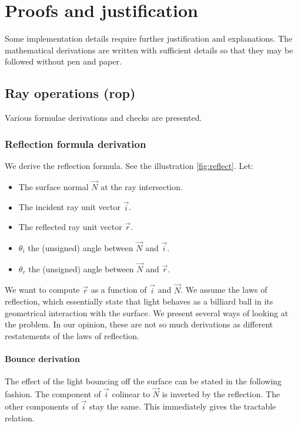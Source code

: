 \section{Proofs and justification}
\label{sec:justification}

Some implementation details require further justification and explanations.
The mathematical derivations are written with sufficient details so that
they may be followed without pen and paper.

\subsection{Ray operations (rop)}
Various formulae derivations and checks are presented.

\subsubsection{Reflection formula derivation}
We derive the reflection formula. See the illustration \cref{fig:reflect}.
Let: \begin{itemize}
\item The surface normal $\overrightarrow{N}$ at the ray intersection.
\item The incident ray unit vector $\overrightarrow{i}$.
\item The reflected ray unit vector $\overrightarrow{r}$.
\item $\theta_i$ the (unsigned) angle between $\overrightarrow{N}$ and
      $\overrightarrow{i}$.
\item $\theta_r$ the (unsigned) angle between $\overrightarrow{N}$ and
      $\overrightarrow{r}$.
\end{itemize}

We want to compute $\overrightarrow{r}$ as a function of $\overrightarrow{i}$
and $\overrightarrow{N}$.  We assume the laws of reflection, which essentially
state that light behaves as a billiard ball in its geometrical interaction with
the surface.  We present several ways of looking at the problem. In our
opinion, these are not so much derivations as different restatements of the
laws of reflection.

\paragraph{Bounce derivation}
The effect of the light bouncing off the surface can be stated in the following
fashion. The component of $\overrightarrow{i}$ colinear to $\overrightarrow{N}$
is inverted by the reflection. The other components of $\overrightarrow{i}$ stay
the same. This immediately gives the tractable relation.

